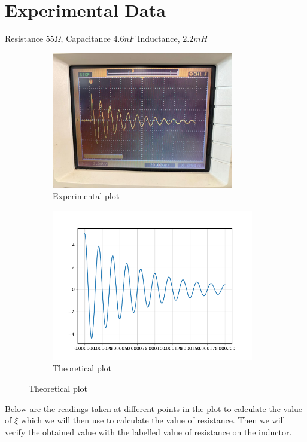 \documentclass[a4paper,12pt]{article}
\begin{document}
\section{Experimental Data}
Resistance $55\Omega$,\newline
Capacitance $4.6nF$\newline
Inductance, $2.2mH$
\begin{figure}[h!]
	\begin{subfigure}[b]{100pt}
		\caption{Experimental plot}
		\includegraphics[width = 225pt]{figs/fig1.png}
	\end{subfigure}
	\hspace{110pt}
	\begin{subfigure}[b]{100pt}
		\caption{Theoretical plot}
		\includegraphics[width = 250pt]{figs/fig2.png}
	\end{subfigure}
\end{figure}
Below are the readings taken at different points in the plot to calculate the value of $\xi$ which we will then use to calculate the value of resistance. Then we will verify the obtained value with the labelled value of resistance on the inductor.
\pagebreak
\end{document}
